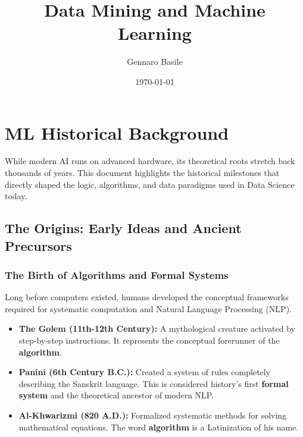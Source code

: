 \documentclass[11pt]{article}
\title{\Huge Data Mining and Machine Learning}
\author{\Large Gennaro Basile}
\date{\today}
\theoremstyle{smallexample}
\begin{document}
\maketitle
{}
\captionsetup[figure]{labelfont=bf}

\pagebreak

\tableofcontents
\pagebreak



\section{ML Historical Background}
While modern AI runs on advanced hardware, its theoretical roots stretch back thousands of years. This document highlights the historical milestones that directly shaped the logic, algorithms, and data paradigms used in Data Science today.

\subsection{The Origins: Early Ideas and Ancient Precursors}

\subsubsection{The Birth of Algorithms and Formal Systems}
Long before computers existed, humans developed the conceptual frameworks required for systematic computation and Natural Language Processing (NLP).
\begin{itemize}
    \item \textbf{The Golem (11th-12th Century):} A mythological creature activated by step-by-step instructions. It represents the conceptual forerunner of the \textbf{algorithm}.
    \item \textbf{Panini (6th Century B.C.):} Created a system of rules completely describing the Sanskrit language. This is considered history's first \textbf{formal system} and the theoretical ancestor of modern NLP.
    \item \textbf{Al-Khwarizmi (820 A.D.):} Formalized systematic methods for solving mathematical equations. The word \textbf{algorithm} is a Latinization of his name.
\end{itemize}
\end{document}
